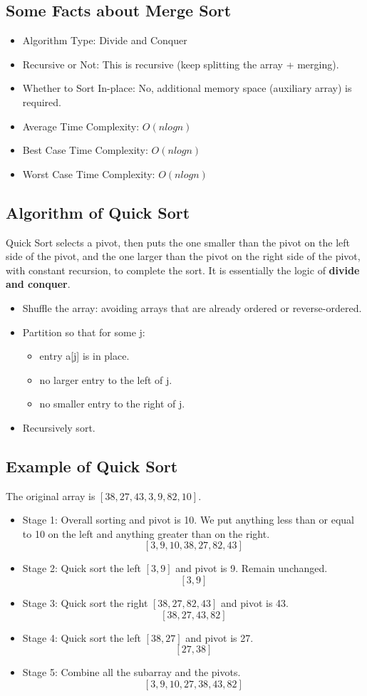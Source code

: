 \documentclass[letterpaper,12pt]{article}
\begin{document}
\subsection{Some Facts about Merge Sort}
\begin{itemize}
    \item Algorithm Type: Divide and Conquer
    \item Recursive or Not: This is recursive (keep splitting the array + merging).
    \item Whether to Sort In-place: No, additional memory space (auxiliary array) is required.
    \item Average Time Complexity: $O(n logn)$
    \item Best Case Time Complexity: $O(n logn)$
    \item Worst Case Time Complexity: $O(n logn)$
\end{itemize}

\subsection{Algorithm of Quick Sort}
Quick Sort selects a pivot, then puts the one smaller than the pivot on the left side of the pivot, and the one larger than the pivot on the right side of the pivot, with constant recursion, to complete the sort. It is essentially the logic of \textbf{divide and conquer}.
\begin{itemize}
    \item Shuffle the array: avoiding arrays that are already ordered or reverse-ordered.
    \item Partition so that for some j:
    \begin{itemize}
        \item entry a[j] is in place.
        \item no larger entry to the left of j.
        \item no smaller entry to the right of j.
    \end{itemize}
    \item Recursively sort.
\end{itemize}

\subsection{Example of Quick Sort}
The original array is $[38,27,43,3,9,82,10]$.
\begin{itemize}
    \item Stage 1: Overall sorting and pivot is 10. We put anything less than or equal to 10 on the left and anything greater than on the right.
    $$[3,9,10,38,27,82,43]$$
    \item Stage 2: Quick sort the left $[3,9]$ and pivot is 9. Remain unchanged.
    $$[3,9]$$
    \item Stage 3: Quick sort the right $[38,27,82,43]$ and pivot is 43.
    $$[38,27,43,82]$$
    \item Stage 4: Quick sort the left $[38,27]$ and pivot is 27.
    $$[27,38]$$
    \item Stage 5: Combine all the subarray and the pivots.
    $$[3,9,10,27,38,43,82]$$
\end{itemize}
\end{document}

